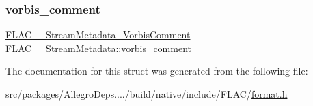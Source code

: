\mbox{\label{struct_f_l_a_c_____stream_metadata_a02662cb0ff19e8229dcd2384f708bae0}} 
\subsubsection{\texorpdfstring{vorbis\+\_\+comment}{vorbis\_comment}}
{\footnotesize\ttfamily \hyperlink{struct_f_l_a_c_____stream_metadata___vorbis_comment}{F\+L\+A\+C\+\_\+\+\_\+\+Stream\+Metadata\+\_\+\+Vorbis\+Comment} F\+L\+A\+C\+\_\+\+\_\+\+Stream\+Metadata\+::vorbis\+\_\+comment}



The documentation for this struct was generated from the following file\+:\begin{DoxyCompactItemize}
\item 
src/packages/\+Allegro\+Deps..../build/native/include/\+F\+L\+A\+C/\hyperlink{format_8h}{format.\+h}\end{DoxyCompactItemize}
